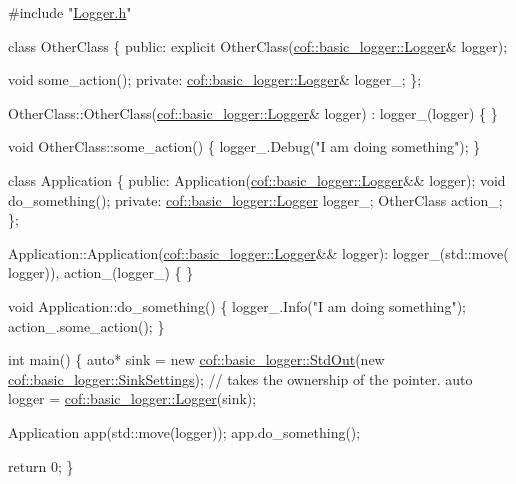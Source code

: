 \begin{DoxyCode}
\textcolor{preprocessor}{#include "\hyperlink{_logger_8h}{Logger.h}"}

\textcolor{keyword}{class }OtherClass
\{
\textcolor{keyword}{public}:
    \textcolor{keyword}{explicit} OtherClass(\hyperlink{classcof_1_1basic__logger_1_1_logger}{cof::basic\_logger::Logger}& logger);

    \textcolor{keywordtype}{void} some\_action();
\textcolor{keyword}{private}:
    \hyperlink{classcof_1_1basic__logger_1_1_logger}{cof::basic\_logger::Logger}& logger\_;
\};

OtherClass::OtherClass(\hyperlink{classcof_1_1basic__logger_1_1_logger}{cof::basic\_logger::Logger}& logger) : logger\_(logger)
\{
\}

\textcolor{keywordtype}{void} OtherClass::some\_action()
\{
    logger\_.Debug(\textcolor{stringliteral}{"I am doing something"});
\}

\textcolor{keyword}{class }Application
\{
\textcolor{keyword}{public}:
    Application(\hyperlink{classcof_1_1basic__logger_1_1_logger}{cof::basic\_logger::Logger}&& logger);
    \textcolor{keywordtype}{void} do\_something();
\textcolor{keyword}{private}:
    \hyperlink{classcof_1_1basic__logger_1_1_logger}{cof::basic\_logger::Logger} logger\_;
    OtherClass action\_;
\};

Application::Application(\hyperlink{classcof_1_1basic__logger_1_1_logger}{cof::basic\_logger::Logger}&& logger): logger\_(std::move(
      logger)), action\_(logger\_)
\{
\}

\textcolor{keywordtype}{void} Application::do\_something()
\{
    logger\_.Info(\textcolor{stringliteral}{"I am doing something"});
    action\_.some\_action();
\}



\textcolor{keywordtype}{int} main()
\{
    \textcolor{keyword}{auto}* sink = \textcolor{keyword}{new} \hyperlink{classcof_1_1basic__logger_1_1_std_out}{cof::basic\_logger::StdOut}(\textcolor{keyword}{new} 
      \hyperlink{structcof_1_1basic__logger_1_1_sink_settings}{cof::basic\_logger::SinkSettings});
    \textcolor{comment}{// takes the ownership of the pointer.}
    \textcolor{keyword}{auto} logger = \hyperlink{classcof_1_1basic__logger_1_1_logger}{cof::basic\_logger::Logger}(sink);

    Application app(std::move(logger));
    app.do\_something();

    \textcolor{keywordflow}{return} 0;
\}
\end{DoxyCode}


